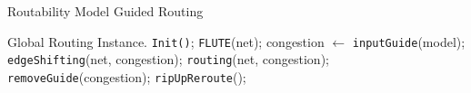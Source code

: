 \begin{algorithm}
    \caption{Routability Model Guided Routing}
    \label{alg:route}
    \begin{algorithmic}[1]
        \Require Global Routing Instance.
        \State \texttt{Init()};
            \State \texttt{FLUTE}(net);
            \State congestion $\gets$ \texttt{inputGuide}(model);
            \State \texttt{edgeShifting}(net, congestion);
            \State \texttt{routing}(net, congestion);
            \State \texttt{removeGuide}(congestion);
                \State \texttt{ripUpReroute}();
            \EndWhile
        \EndWhile
    \end{algorithmic}
\end{algorithm}

    
  
